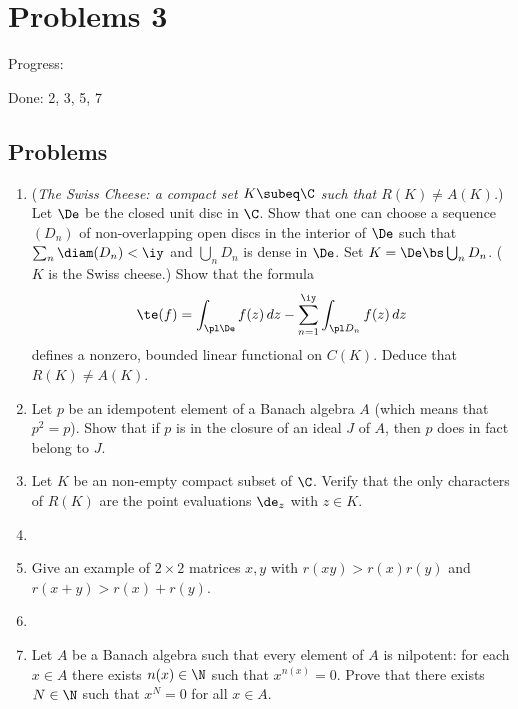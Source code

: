 \chapter{Problems 3}
Progress: 

Done: 2, 3, 5, 7
\section{Problems}
\begin{enumerate}
\item ({\it The Swiss Cheese: a compact set $K\subeq \C$ such that $R(K)\ne A(K)$.}) Let $\De$ be the closed unit disc in $\C$. Show that one can choose a sequence $(D_n)$ of non-overlapping open discs in the interior of $\De$ such that $\sum_n\diam(D_n)<\iy$ and $\bigcup_n D_n$ is dense in $\De$. Set $K=\De\bs \bigcup_n D_n$. ($K$ is the Swiss cheese.) Show that the formula
\[
\te(f)=\int_{\pl \De} f(z)\,dz-\sum_{n=1}^{\iy} \int_{\pl D_n} f(z)\,dz
\]
defines a nonzero, bounded linear functional on $C(K)$. Deduce that $R(K)\ne A(K)$.
\item Let $p$ be an idempotent element of a Banach algebra $A$ (which means that $p^2=p$). Show that if $p$ is in the closure of an ideal $J$ of $A$, then $p$ does in fact belong to $J$.
\item Let $K$ be an non-empty compact subset of $\C$. Verify that the only characters of $R(K)$ are the point evaluations $\de_z$ with $z\in K$.
\item 
\item Give an example of $2\times 2$ matrices $x,y$ with $r(xy)>r(x)r(y)$ and $r(x+y)>r(x)+r(y)$.
\item
\item
Let $A$ be a Banach algebra such that every element of $A$ is nilpotent: for each $x\in A$ there exists $n(x)\in \N$ such that $x^{n(x)}=0$. Prove that there exists $N\in \N$ such that $x^N=0$ for all $x\in A$.
\end{enumerate}

